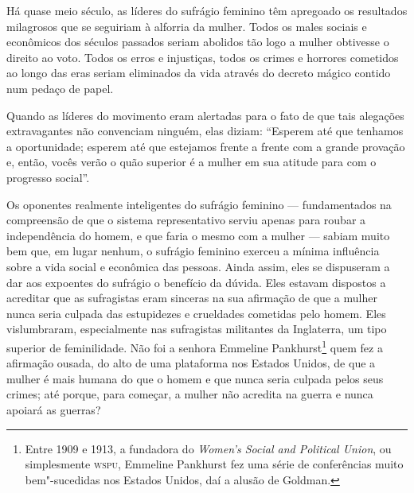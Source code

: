 Há quase meio século, as líderes do sufrágio feminino têm apregoado os
resultados milagrosos que se seguiriam à alforria da mulher. Todos os
males sociais e econômicos dos séculos passados seriam abolidos tão logo
a mulher obtivesse o direito ao voto. Todos os erros e injustiças, todos
os crimes e horrores cometidos ao longo das eras seriam eliminados da
vida através do decreto mágico contido num pedaço de papel.

Quando as líderes do movimento eram alertadas para o fato de que tais
alegações extravagantes não convenciam ninguém, elas diziam: ``Esperem
até que tenhamos a oportunidade; esperem até que estejamos frente a
frente com a grande provação e, então, vocês verão o quão superior é a
mulher em sua atitude para com o progresso social''.

Os oponentes realmente inteligentes do sufrágio feminino ---
fundamentados na compreensão de que o sistema representativo serviu
apenas para roubar a independência do homem, e que faria o mesmo com a
mulher --- sabiam muito bem que, em lugar nenhum, o sufrágio feminino
exerceu a mínima influência sobre a vida social e econômica das pessoas.
Ainda assim, eles se dispuseram a dar aos expoentes do sufrágio o
benefício da dúvida. Eles estavam dispostos a acreditar que as
sufragistas eram sinceras na sua afirmação de que a mulher nunca seria
culpada das estupidezes e crueldades cometidas pelo homem. Eles
vislumbraram, especialmente nas sufragistas militantes da Inglaterra, um
tipo superior de feminilidade. Não foi a senhora Emmeline
Pankhurst\footnote{Entre 1909 e 1913, a fundadora do \emph{Women's
  Social and Political Union}, ou simplesmente \textsc{wspu}, Emmeline Pankhurst
  fez uma série de conferências muito bem"-sucedidas nos Estados Unidos,
  daí a alusão de Goldman.} quem fez a afirmação ousada, do alto de uma
plataforma nos Estados Unidos, de que a mulher é mais humana do que o
homem e que nunca seria culpada pelos seus crimes; até porque, para
começar, a mulher não acredita na guerra e nunca apoiará as guerras?

